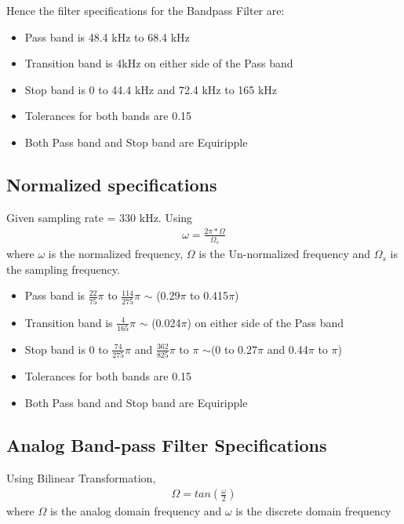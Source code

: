\documentclass[12pt]{article}
\begin{document}
\noindent Hence the filter specifications for the Bandpass Filter are:
\begin{itemize}
	\item Pass band is 48.4 kHz to 68.4 kHz
	\item Transition band is 4kHz on either side of the Pass band
	\item Stop band is 0 to 44.4 kHz and 72.4 kHz to 165 kHz
	\item Tolerances for both bands are 0.15
	\item Both Pass band and Stop band are Equiripple
\end{itemize}

\color{cyan}
\subsection{Normalized specifications}
\color{black}
Given sampling rate  = 330 kHz. Using\\
\begin{gather*}
	\omega = \frac{2\pi \ast \Omega}{\Omega_s}
\end{gather*}
where $\omega$ is the normalized frequency, $\Omega$ is the Un-normalized frequency and $\Omega_s$ is the sampling frequency.
\begin{itemize}
	\item Pass band is $\frac{22}{75}\pi$ to $\frac{114}{275}\pi$ $\sim$ (0.29$\pi$ to 0.415$\pi$)
	\item Transition band is $\frac{4}{165}\pi$ $\sim$ (0.024$\pi$) on either side of the Pass band
	\item Stop band is 0 to  $\frac{74}{275}\pi$ and $\frac{362}{825}\pi$ to $\pi$  $\sim$(0 to 0.27$\pi$ and  0.44$\pi$ to $\pi$)
	\item Tolerances for both bands are 0.15
	\item Both Pass band and Stop band are Equiripple
\end{itemize}

\color{cyan}
\subsection{Analog Band-pass Filter Specifications}
\color{black}
Using Bilinear Transformation,
\begin{gather*}
	\Omega = tan\left(\frac{\omega}{2}\right)
\end{gather*}
where $\Omega$ is the analog domain frequency and $\omega$ is the discrete domain frequency\\
\end{document}
